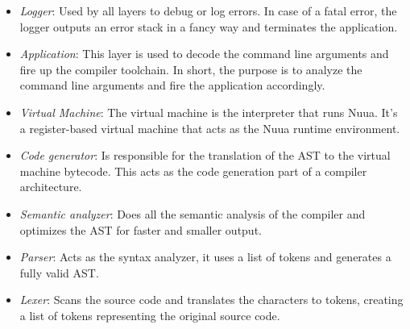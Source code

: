 \begin{itemize}
    \item \emph{Logger}: Used by all layers to debug or log errors. In case of a fatal error, the logger outputs
        an error stack in a fancy way and terminates the application.
    \item \emph{Application}: This layer is used to decode the command line arguments and fire up the compiler toolchain. In short,
        the purpose is to analyze the command line arguments and fire the application accordingly.
    \item \emph{Virtual Machine}: The virtual machine is the interpreter that runs Nuua. It's a register-based virtual machine that
        acts as the Nuua runtime environment.
    \item \emph{Code generator}: Is responsible for the translation of the AST to the virtual machine bytecode. This acts as the code generation
        part of a compiler architecture.
    \item \emph{Semantic analyzer}: Does all the semantic analysis of the compiler and optimizes the AST for faster and smaller output.
    \item \emph{Parser}: Acts as the syntax analyzer, it uses a list of tokens and generates a fully valid AST.
    \item \emph{Lexer}: Scans the source code and translates the characters to tokens, creating a list of tokens representing
        the original source code.
\end{itemize}

